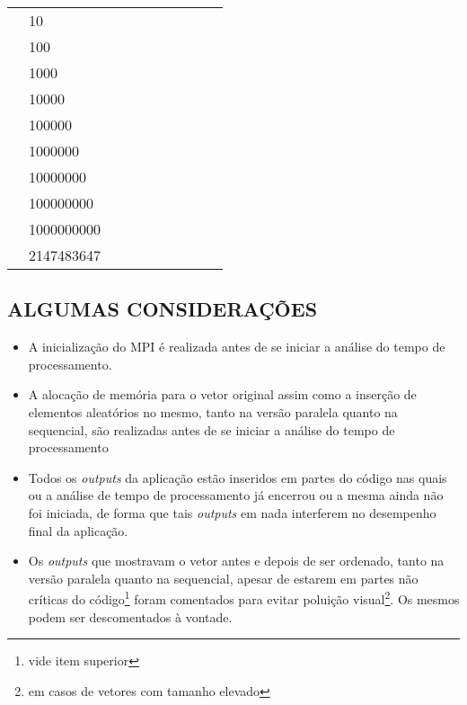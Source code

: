 \begin{flushleft}
{\begin{tabular}{|p{1.5cm}|p{1.2cm}|p{1.3cm}|p{1.3cm}|p{1.3cm}|p{1.3cm}|p{1.3cm}|p{1.3cm}|p{1.3cm}|p{1.3cm}|}
 & 10 &  &  &  &  &  &  &  & \\
&100 &  &  &  &  &  &  &  & \\
&1000 &  &  &  &  &  &  &  & \\
&10000 &  &  &  &  &  &  &  & \\
&100000 &  &  &  &  &  &  &  & \\
&1000000 &  &  &  &  &  &  &  & \\
&10000000 &  &  &  &  &  &  &  & \\
&100000000 &  &  &  &  &  &  &  & \\
&1000000000 &  &  &  &  &  &  &  & \\
&2147483647 &  &  &  &  &  &  &  & \\\hline
\end{tabular}
}
\end{flushleft}

\subsection{\normalsize ALGUMAS CONSIDERAÇÕES}
	\begin{itemize}
		\item A inicialização do MPI é realizada antes de se iniciar a análise do tempo de processamento.
		
		\item A alocação de memória para o vetor original assim como a inserção de elementos aleatórios no mesmo, tanto na versão paralela quanto na sequencial, são realizadas antes de se iniciar a análise do tempo de processamento 

		\item Todos os \textit{outputs} da aplicação estão inseridos em partes do código nas quais ou a análise de tempo de processamento já encerrou ou a mesma ainda não foi iniciada, de forma que tais \textit{outputs} em nada interferem no desempenho final da aplicação.

		\item Os \textit{outputs} que mostravam o vetor antes e depois de ser ordenado, tanto na versão paralela quanto na sequencial, apesar de estarem em partes não críticas do código\footnote{vide item superior} foram comentados para evitar poluição visual\footnote{em casos de vetores com tamanho elevado}. Os mesmos podem ser descomentados à vontade.
	\end{itemize}